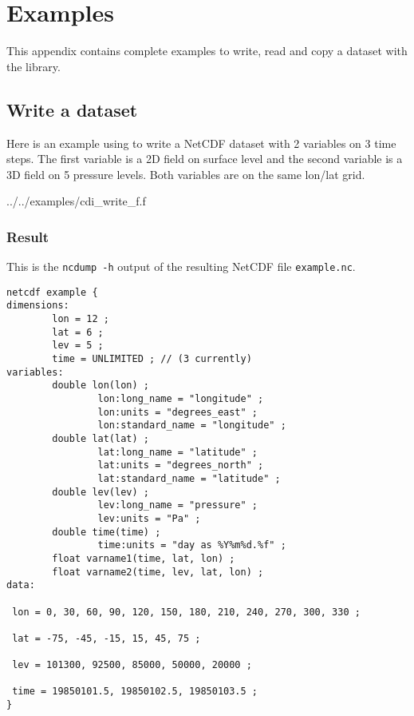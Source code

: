 
\chapter{\label{example}Examples}

This appendix contains complete examples to write, read
and copy a dataset with the {\CDI} library.


\section{\label{example_write}Write a dataset}

Here is an example using {\CDI} to write a NetCDF dataset with 
2 variables on 3 time steps. The first variable is a 2D field
on surface level and the second variable is a 3D field on 5 pressure
levels. Both variables are on the same lon/lat grid. 


{../../examples/cdi_write_f.f}


\subsection{Result}

This is the \texttt{ncdump -h} output of the resulting NetCDF file \texttt{example.nc}.

\begin{lstlisting}[]
netcdf example {
dimensions:
        lon = 12 ;
        lat = 6 ;
        lev = 5 ;
        time = UNLIMITED ; // (3 currently)
variables:
        double lon(lon) ;
                lon:long_name = "longitude" ;
                lon:units = "degrees_east" ;
                lon:standard_name = "longitude" ;
        double lat(lat) ;
                lat:long_name = "latitude" ;
                lat:units = "degrees_north" ;
                lat:standard_name = "latitude" ;
        double lev(lev) ;
                lev:long_name = "pressure" ;
                lev:units = "Pa" ;
        double time(time) ;
                time:units = "day as %Y%m%d.%f" ;
        float varname1(time, lat, lon) ;
        float varname2(time, lev, lat, lon) ;
data:

 lon = 0, 30, 60, 90, 120, 150, 180, 210, 240, 270, 300, 330 ;

 lat = -75, -45, -15, 15, 45, 75 ;

 lev = 101300, 92500, 85000, 50000, 20000 ;

 time = 19850101.5, 19850102.5, 19850103.5 ;
}
\end{lstlisting}


